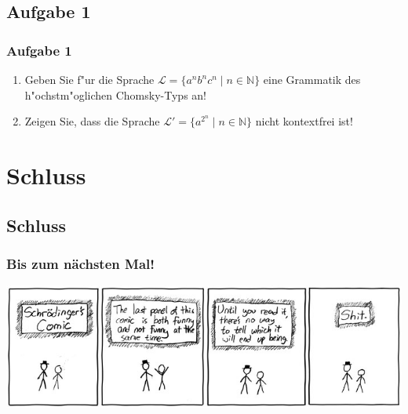 \subsection{Aufgabe 1}
\begin{frame}
	\frametitle{Aufgabe 1}
	\begin{enumerate}
		\item Geben Sie f"ur die Sprache $\mathcal{L} = \{a^nb^nc^n \; | \; n \in
		\mathbb{N}\}$ eine Grammatik des h"ochstm"oglichen Chomsky-Typs an!
		\item Zeigen Sie, dass die Sprache $\mathcal{L}' = \{a^{2^n} \; | \; n \in
		\mathbb{N}\}$ nicht kontextfrei ist!
	\end{enumerate}
\end{frame}

\section{Schluss}
\subsection{Schluss}

\begin{frame}
\frametitle{Bis zum nächsten Mal!}
\begin{center}
  \includegraphics[width=1.5 \textheight]{images/schrodinger.jpg}
\end{center}
\end{frame}

